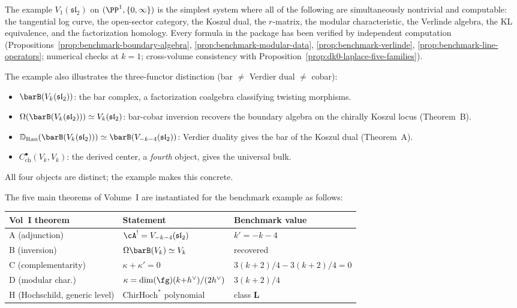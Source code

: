 \begin{remark}
\label{rem:benchmark-consistency}
The example $V_1(\mathfrak{sl}_2)$ on $(\PP^1, \{0,\infty\})$
is the simplest system where all of the following are
simultaneously nontrivial and computable: the tangential log
curve, the open-sector category, the Koszul dual, the $r$-matrix,
the modular characteristic, the Verlinde algebra, the KL
equivalence, and the factorization homology. Every formula in
the package has been verified by independent computation
(Propositions~\ref{prop:benchmark-boundary-algebra},
\ref{prop:benchmark-modular-data},
\ref{prop:benchmark-verlinde},
\ref{prop:benchmark-line-operators};
numerical checks at $k = 1$;
cross-volume consistency with
Proposition~\ref{prop:dk0-laplace-five-families}).

The example also illustrates the three-functor distinction
(bar $\neq$ Verdier dual $\neq$ cobar):
\begin{itemize}[nosep]
\item $\barB(V_k(\mathfrak{sl}_2))$: the bar complex,
 a factorization coalgebra classifying twisting morphisms.
\item $\Omega(\barB(V_k(\mathfrak{sl}_2))) \simeq
 V_k(\mathfrak{sl}_2)$: bar-cobar inversion recovers the
 boundary algebra on the chirally Koszul locus
 \textup{(}Theorem~B\textup{)}.
\item $\mathbb{D}_{\mathrm{Ran}}(\barB(V_k(\mathfrak{sl}_2)))
 \simeq \barB(V_{-k-4}(\mathfrak{sl}_2))$: Verdier duality
 gives the bar of the Koszul dual (Theorem~A).
\item $C^\bullet_{\mathrm{ch}}(V_k, V_k)$: the derived center,
 a \emph{fourth} object, gives the universal bulk.
\end{itemize}
All four objects are distinct; the example makes this concrete.
\end{remark}

\begin{remark}
\label{rem:benchmark-vol1-verification}
The five main theorems of Volume~I are instantiated for the
benchmark example as follows:
\begin{center}
\renewcommand{\arraystretch}{1.2}
\small
\begin{tabular}{lll}
\textbf{Vol~I theorem} & \textbf{Statement}
 & \textbf{Benchmark value} \\
\hline
A (adjunction) & $\cA^! = V_{-k-4}(\mathfrak{sl}_2)$ &
 $k' = -k - 4$ \\
B (inversion) & $\Omega \barB(V_k) \simeq V_k$ &
 recovered \\
C (complementarity) & $\kappa + \kappa' = 0$ &
 $3(k{+}2)/4 - 3(k{+}2)/4 = 0$ \\
D (modular char.) & $\kappa = \dim(\fg)(k{+}h^\vee)/(2h^\vee)$
 & $3(k{+}2)/4$ \\
H (Hochschild, generic level) & $\mathrm{ChirHoch}^*$ polynomial &
 class $\mathbf{L}$ \\
\end{tabular}
\end{center}
\end{remark}


